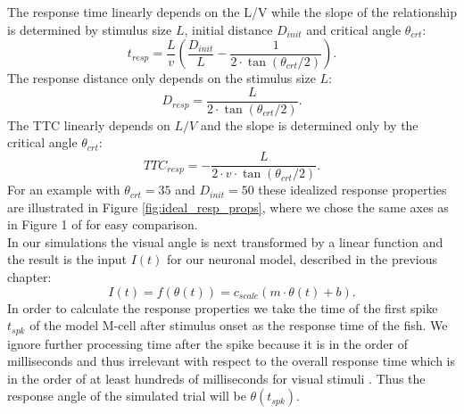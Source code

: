     The response time linearly depends on the L/V while the slope of the relationship is determined by stimulus size $L$, initial distance $D_{init}$ and critical angle $\theta_{crt}$:
	\begin{equation}
	t_{resp} = \dfrac{L}{v} \left(\dfrac{D_{init}}{L} - \dfrac{1}{2\cdot\tan(\theta_{crt} /2)}\right).
	\label{eq:resp_time}
	\end{equation}
    The response distance only depends on the stimulus size $L$:
    \begin{equation}
	D_{resp} = \dfrac{L}{2\cdot \tan(\theta_{crt} /2)}.
	\label{eq:resp_dist}
	\end{equation}
    The TTC linearly depends on $L/V$ and the slope is determined only by the critical angle $\theta_{crt}$:
	\begin{equation}
	TTC_{resp} = - \dfrac{L}{2\cdot v\cdot \tan(\theta_{crt} /2)}.
	\label{eq:resp_ttc}
	\end{equation}
    For an example with $\theta_{crt}=35$ and $D_{init}=50$ these idealized response properties are illustrated in Figure \ref{fig:ideal_resp_props}, where we chose the same axes as in Figure 1 of \cite{Bhattacharyya2017} for easy comparison.\\
	In our simulations the visual angle is next transformed by a linear function and the result is the input $I(t)$ for our neuronal model, described in the previous chapter:
	\begin{equation}
	I(t) = f(\theta (t)) = c_{scale}(m \cdot \theta(t) + b).
	\label{eq:input}
	\end{equation}
	In order to calculate the response properties we take the time of the first spike $t_{spk}$ of the model M-cell after stimulus onset as the response time of the fish.
	We ignore further processing time after the spike because it is in the order of milliseconds \citep{Preuss2003} and thus irrelevant with respect to the overall response time which is in the order of at least hundreds of milliseconds for visual stimuli \citep{Preuss2006}.
	Thus the response angle of the simulated trial will be $\theta (t_{spk})$.
	
